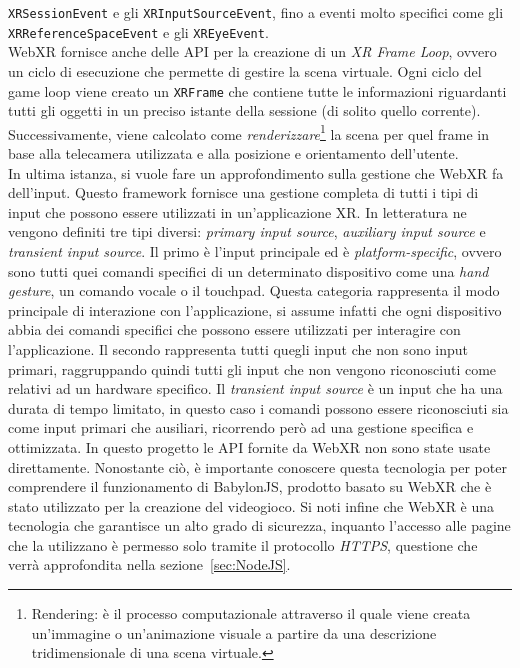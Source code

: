 \texttt{XRSessionEvent} e gli \texttt{XRInputSourceEvent}, fino a eventi molto specifici come gli \texttt{XRReferenceSpaceEvent} e gli \texttt{XREyeEvent}.\\
WebXR fornisce anche delle API per la creazione di un \textit{XR Frame Loop}, ovvero un ciclo di esecuzione che permette di gestire la scena virtuale. Ogni
ciclo del game loop viene creato un \texttt{XRFrame} che contiene tutte le informazioni riguardanti tutti gli oggetti in un preciso istante della sessione (di solito quello corrente).
Successivamente, viene calcolato come \textit{renderizzare}\footnote{Rendering: è il processo computazionale attraverso il quale viene creata un'immagine o un'animazione visuale a 
partire da una descrizione tridimensionale di una scena virtuale.} la scena per quel frame in base alla telecamera utilizzata e alla posizione e orientamento dell'utente.\\
\newline
In ultima istanza, si vuole fare un approfondimento sulla gestione che WebXR fa dell'input. Questo framework fornisce una gestione completa di tutti i tipi di input che possono
essere utilizzati in un'applicazione XR. In letteratura ne vengono definiti tre tipi diversi: \textit{primary input source}, \textit{auxiliary input source} e \textit{transient
input source}. Il primo è l'input principale ed è \textit{platform-specific}, ovvero sono tutti quei comandi specifici di un determinato dispositivo come una \textit{hand gesture},
un comando vocale o il touchpad. Questa categoria rappresenta il modo principale di interazione con l'applicazione, si assume infatti che ogni dispositivo abbia dei comandi specifici
che possono essere utilizzati per interagire con l'applicazione. Il secondo rappresenta tutti quegli input che non sono input primari, raggruppando quindi tutti gli input
che non vengono riconosciuti come relativi ad un hardware specifico. Il \textit{transient input source} è un input che ha una durata di tempo limitato, in questo caso i comandi
possono essere riconosciuti sia come input primari che ausiliari, ricorrendo però ad una gestione specifica e ottimizzata.
\newline \newline
In questo progetto le API fornite da WebXR non sono state usate direttamente. Nonostante ciò, è importante conoscere questa tecnologia per poter comprendere il funzionamento
di BabylonJS, prodotto basato su WebXR che è stato utilizzato per la creazione del videogioco. Si noti infine che WebXR è una tecnologia che garantisce un alto grado di sicurezza, inquanto
l'accesso alle pagine che la utilizzano è permesso solo tramite il protocollo \textit{HTTPS}, questione che verrà approfondita nella sezione~\ref{sec:NodeJS}. 

